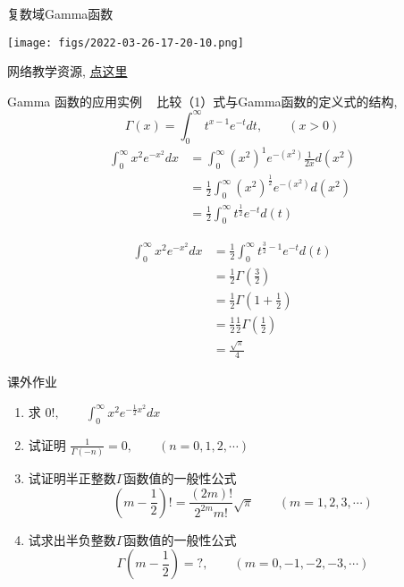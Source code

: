	{复数域Gamma函数}
  \begin{center}
	   \texttt{[image: figs/2022-03-26-17-20-10.png]}
  \end{center}
  网络教学资源, \href{https://www.bilibili.com/video/av892512155/}{点这里}



	{Gamma 函数的应用实例}
	{}
	{\解} ~ 比较（1）式与Gamma函数的定义式的结构,
	\[\Gamma(x)=\int_{0}^{\infty} t^{x-1} e^{-t} dt, \qquad (x>0)\]
	\[\begin{aligned}
		\int_{0}^{\infty} x^2 e^{-x^2} dx &= \int_{0}^{\infty} (x^2)^1 e^{-(x^2)} \frac{1}{2x}d(x^2)\\
		&= \frac{1}{2}\int_{0}^{\infty} (x^2)^{\frac{1}{2}} e^{-(x^2)} d(x^2)\\	
		&= \frac{1}{2}\int_{0}^{\infty} t^{\frac{1}{2}} e^{-t} d(t)
	\end{aligned} \]



	  {}
	  \[\begin{aligned}
		\int_{0}^{\infty} x^2 e^{-x^2} dx &= \frac{1}{2}\int_{0}^{\infty} t^{\frac{3}{2}-1} e^{-t} d(t)\\	
		&= \frac{1}{2}\Gamma(\frac{3}{2})  \\ 
		&= \frac{1}{2}\Gamma(1+\frac{1}{2})  \\ 
		&= \frac{1}{2} \frac{1}{2} \Gamma(\frac{1}{2})  \\ 
		&= \frac{\sqrt{\pi}}{4} 
	\end{aligned} \]



	{课外作业}
	\begin{enumerate}
		\item 求 $0!, \qquad \int_{0}^{\infty} x^2 e^{-\frac{1}{2}x^2} dx $
		\item 试证明 $ \frac{1}{\Gamma(-n)} =0, \qquad (n=0,1,2, \cdots) $
		\item 试证明半正整数$\Gamma$函数值的一般性公式
		\[ (m-\frac{1}{2})! =\frac{(2m)!}{2^{2m} m!}\sqrt{\pi} \qquad (m=1,2,3,\cdots) \]
		\item 试求出半负整数$\Gamma$函数值的一般性公式
		\[\Gamma(m-\frac{1}{2})=?, \qquad (m=0,-1,-2,-3,\cdots)\]	
	\end{enumerate}


